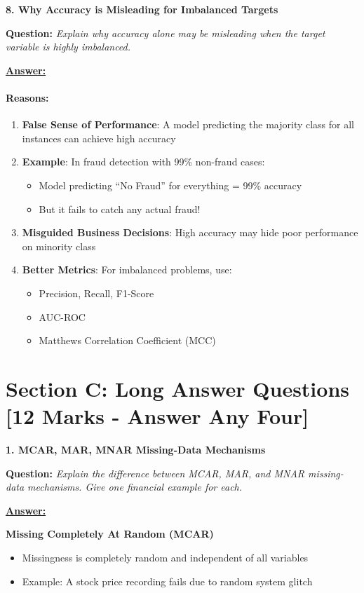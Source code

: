 \documentclass[11pt,a4paper]{article}
\newcommand{\questiontitle}[2]{%
    \vspace{0.4cm}%
    \noindent\textbf{\large\color{headerblue}#1. #2}\par\vspace{0.15cm}%
}
\newcommand{\qprompt}[1]{%
    \noindent\textbf{Question:} \textit{#1}\par\vspace{0.2cm}%
}
\newcommand{\answer}{\noindent\textbf{\underline{Answer:}}\par\vspace{0.15cm}}
\begin{document}
\vspace{0.35cm}

\questiontitle{8}{Why Accuracy is Misleading for Imbalanced Targets}
\qprompt{Explain why accuracy alone may be misleading when the target variable is highly imbalanced.}
\answer
\paragraph{Reasons:}
\begin{enumerate}
    \item \textbf{False Sense of Performance}: A model predicting the majority class for all instances can achieve high accuracy
    \item \textbf{Example}: In fraud detection with 99\% non-fraud cases:
    \begin{itemize}
        \item Model predicting ``No Fraud'' for everything = 99\% accuracy
        \item But it fails to catch any actual fraud!
    \end{itemize}
    \item \textbf{Misguided Business Decisions}: High accuracy may hide poor performance on minority class
    \item \textbf{Better Metrics}: For imbalanced problems, use:
    \begin{itemize}
        \item Precision, Recall, F1-Score
        \item AUC-ROC
        \item Matthews Correlation Coefficient (MCC)
    \end{itemize}
\end{enumerate}

\vspace{0.5cm}

\section*{Section C: Long Answer Questions \hfill [12 Marks - Answer Any Four]}

\questiontitle{1}{MCAR, MAR, MNAR Missing-Data Mechanisms}
\qprompt{Explain the difference between MCAR, MAR, and MNAR missing-data mechanisms. Give one financial example for each.}
\answer
\noindent\textbf{Missing Completely At Random (MCAR)}
\begin{itemize}
    \item Missingness is completely random and independent of all variables
    \item Example: A stock price recording fails due to random system glitch
\end{itemize}
\end{document}
